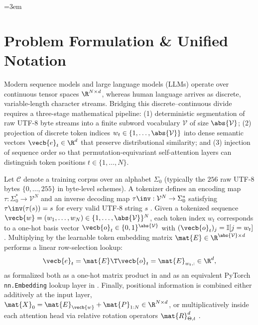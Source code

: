 \documentclass[../../../../master.tex]{subfiles}
\begin{document}
\sloppy\emergencystretch=3em

\section{Problem Formulation \& Unified Notation}
\label{sec:tok:formulation}

Modern sequence models and large language models (LLMs) operate over continuous tensor spaces $\R^{N \times d}$, whereas human language arrives as discrete, variable-length character streams. Bridging this discrete--continuous divide requires a three-stage mathematical pipeline: (1) deterministic segmentation of raw UTF-8 byte streams into a finite subword vocabulary $\mathcal{V}$ of size $\abs{\mathcal{V}}$; (2) projection of discrete token indices $w_t \in \{1,\dots,\abs{\mathcal{V}}\}$ into dense semantic vectors $\vecb{e}_t \in \R^d$ that preserve distributional similarity; and (3) injection of sequence order so that permutation-equivariant self-attention layers can distinguish token positions $t \in \{1,\dots,N\}$.

Let $\mathcal{C}$ denote a training corpus over an alphabet $\Sigma_0$ (typically the $256$ raw UTF-8 bytes $\{0,\dots,255\}$ in byte-level schemes). A tokenizer defines an encoding map $\tau: \Sigma_0^* \to \mathcal{V}^N$ and an inverse decoding map $\tau\inv: \mathcal{V}^N \to \Sigma_0^*$ satisfying $\tau\inv(\tau(s)) = s$ for every valid UTF-8 string $s$ . Given a tokenized sequence $\vecb{w} = (w_1, \dots, w_N) \in \{1,\dots,\abs{\mathcal{V}}\}^N$, each token index $w_t$ corresponds to a one-hot basis vector $\vecb{o}_t \in \{0,1\}^{\abs{\mathcal{V}}}$ with $(\vecb{o}_t)_j = \mathbb{I}[j = w_t]$. Multiplying by the learnable token embedding matrix $\mat{E} \in \R^{\abs{\mathcal{V}} \times d}$ performs a linear row-selection lookup:
\begin{equation}
  \vecb{e}_t = \mat{E}\T \vecb{o}_t = \mat{E}_{w_t, :} \in \R^d,
  \label{eq:tok:lookup}
\end{equation}
as formalized both as a one-hot matrix product in  and as an equivalent PyTorch \texttt{nn.Embedding} lookup layer in . Finally, positional information is combined either additively at the input layer, $\mat{X}_0 = \mat{E}_{\vecb{w}} + \mat{P}_{1:N} \in \R^{N \times d}$, or multiplicatively inside each attention head via relative rotation operators $\mat{R}_{\Theta, t}^d$ .
\end{document}
